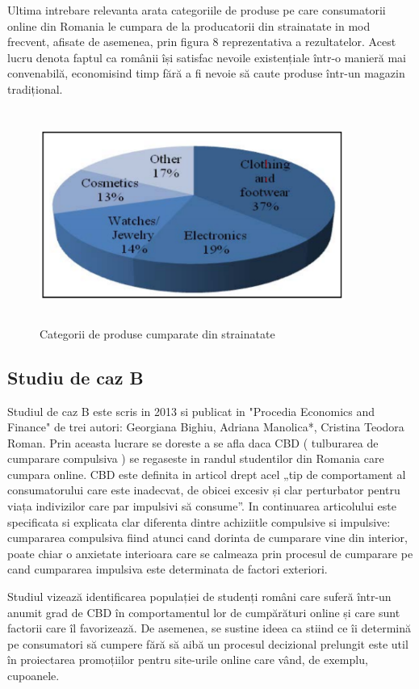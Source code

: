 \documentclass[a4paper, 12pt]{article}
\begin{document}
	\quad Ultima intrebare relevanta arata categoriile de produse pe care consumatorii online din Romania le cumpara de la producatorii din strainatate in mod frecvent, afisate de asemenea, prin figura 8 reprezentativa a rezultatelor. Acest lucru denota faptul ca românii își satisfac nevoile existențiale într-o manieră mai convenabilă, economisind timp fără a fi nevoie să caute produse într-un magazin tradițional.
		\begin{figure}[!htb]
			\centering
			\includegraphics[width=10cm, height=7cm]{"figures/eigth.png"}
			\caption{Categorii de produse cumparate din strainatate}\label{fig:eigth}
		\end{figure}
	\newpage
	\subsection {Studiu de caz B}
	\qquad Studiul de caz B este scris in 2013 si publicat in "Procedia Economics and Finance" de trei autori: Georgiana Bighiu, Adriana Manolica*, Cristina Teodora Roman. Prin aceasta lucrare se doreste a se afla daca CBD ( tulburarea de cumparare compulsiva ) se regaseste in randul studentilor din Romania care cumpara online. CBD este definita in articol drept acel „tip de comportament al consumatorului care este inadecvat, de obicei excesiv și clar perturbator pentru viața indivizilor care par impulsivi să consume”. In continuarea articolului  este specificata si explicata clar diferenta dintre achiziitle compulsive si impulsive: cumpararea compulsiva fiind atunci cand dorinta de cumparare vine din interior, poate chiar o anxietate interioara care se calmeaza prin procesul de cumparare pe cand cumpararea impulsiva este determinata de factori exteriori.
	
	\quad Studiul vizează identificarea  populației de studenți români care suferă într-un anumit grad de CBD în comportamentul lor de cumpărături online și care sunt factorii care îl favorizează. De asemenea, se sustine ideea ca stiind ce îi determină pe consumatori să cumpere fără să aibă un procesul decizional prelungit este util în proiectarea promoțiilor pentru site-urile online care vând, de exemplu, cupoanele.  
	
\end{document}
